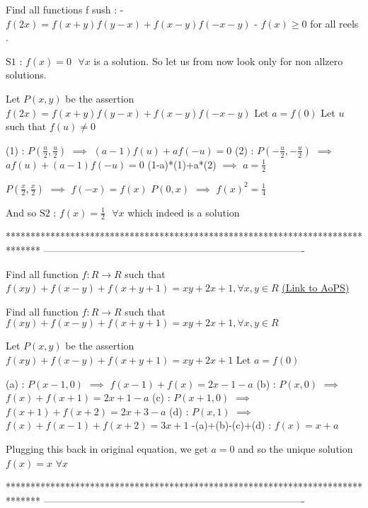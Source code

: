\begin{solution}
	\begin{tcolorbox}Find all functions f sush : 
 - $ f(2x) =f(x+y)f(y-x) + f(x-y)f(-x-y) $ 
 - $ f(x) \ge 0 $  for all reels .\end{tcolorbox}
$\boxed{\text{S1 : }f(x)=0\text{  }\forall x}$ is a solution. So let us from now look only for non allzero solutions.

Let $P(x,y)$ be the assertion $f(2x)=f(x+y)f(y-x)+f(x-y)f(-x-y)$
Let $a=f(0)$
Let $u$ such that $f(u)\ne 0$

(1) : $P(\frac u2,\frac u2)$ $\implies$ $(a-1)f(u)+af(-u)=0$
(2) : $P(-\frac u2,-\frac u2)$ $\implies$ $af(u)+(a-1)f(-u)=0$
(1-a)*(1)+a*(2) $\implies$ $a=\frac 12$

$P(\frac x2,\frac x2)$ $\implies$ $f(-x)=f(x)$
$P(0,x)$ $\implies$ $f(x)^2=\frac 14$

And so $\boxed{\text{S2 : }f(x)=\frac 12\text{  }\forall x}$ which indeed is a solution
\end{solution}
*******************************************************************************
-------------------------------------------------------------------------------

\begin{problem}
	Find all function $ f:R\rightarrow R  $  such that
$f(xy)+f(x-y)+f(x+y+1)=xy+2x+1,\forall x,y\in {R}$
	\flushright \href{https://artofproblemsolving.com/community/c6h612067}{(Link to AoPS)}
\end{problem}



\begin{solution}
	\begin{tcolorbox}Find all function $ f:R\rightarrow R  $  such that
$f(xy)+f(x-y)+f(x+y+1)=xy+2x+1,\forall x,y\in {R}$\end{tcolorbox}
Let $P(x,y)$ be the assertion $f(xy)+f(x-y)+f(x+y+1)=xy+2x+1$
Let $a=f(0)$

(a) : $P(x-1,0)$ $\implies$ $f(x-1)+f(x)=2x-1-a$
(b) : $P(x,0)$ $\implies$ $f(x)+f(x+1)=2x+1-a$
(c) : $P(x+1,0)$ $\implies$ $f(x+1)+f(x+2)=2x+3-a$
(d) : $P(x,1)$ $\implies$ $f(x)+f(x-1)+f(x+2)=3x+1$
-(a)+(b)-(c)+(d) : $f(x)=x+a$

Plugging this back in original equation, we get $a=0$ and so the unique solution $\boxed{f(x)=x}$ $\forall x$
\end{solution}
*******************************************************************************
-------------------------------------------------------------------------------

